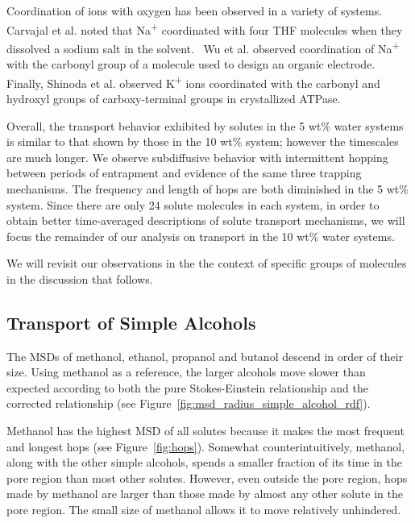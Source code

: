 \documentclass[journal=jpcbfk,manuscript=article]{achemso}
\begin{document}
  Coordination of ions with oxygen has been observed in a variety of systems. 
  Carvajal et al. noted that Na\textsuperscript{+} coordinated with four 
  THF molecules when they dissolved a sodium salt in the solvent.~\cite{carvajal_studies_1965}
  Wu et al. observed coordination of Na\textsuperscript{+} with the carbonyl
  group of a molecule used to design an organic electrode.~\cite{wu_unraveling_2015} 
  Finally, Shinoda et al. observed K\textsuperscript{+} ions coordinated with
  the carbonyl and hydroxyl groups of carboxy-terminal groups in crystallized
  ATPase.~\cite{shinoda_crystal_2009}
  
  Overall, the transport behavior exhibited by solutes in the 5 wt\% water
  systems is similar to that shown by those in the 10 wt\% system; however
  the timescales are much longer. We observe subdiffusive behavior with 
  intermittent hopping between periods of entrapment and evidence
  of the same three trapping mechanisms. The frequency and 
  length of hops are both diminished in the 5 wt\% system. Since there are
  only 24 solute molecules in each system, in order to obtain better 
  time-averaged descriptions of solute transport mechanisms, we will focus
  the remainder of our analysis on transport in the 10 wt\% water systems.
  
  We will revisit our observations in the the context of specific groups of 
  molecules in the discussion that follows.
  
  \subsection{Transport of Simple Alcohols}

  The MSDs of methanol, ethanol, propanol and butanol descend in order of 
  their size. Using methanol as a reference, the larger alcohols move slower
  than expected according to both the pure Stokes-Einstein relationship 
  and the corrected relationship (see Figure~\ref{fig:msd_radius_simple_alcohol_rdf}).
  
  Methanol has the highest MSD of all solutes because it makes the most frequent
  and longest hops (see Figure~\ref{fig:hops}). Somewhat counterintuitively, 
  methanol, along with the other simple alcohols, spends a smaller fraction of its
  time in the pore region than most other solutes. However, even outside the pore
  region, hops made by methanol are larger than those made by almost any other solute
  in the pore region. The small size of methanol allows it to move relatively unhindered. 
\end{document}
